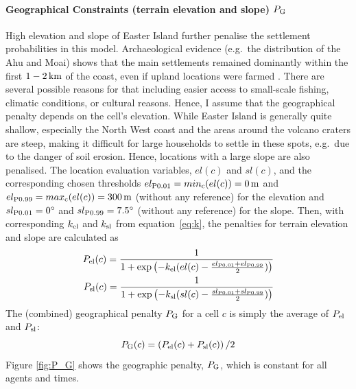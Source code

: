 \paragraph{Geographical Constraints (terrain elevation and slope) $P_{\rm G}$}
High elevation and slope of Easter Island further penalise the settlement probabilities in this model.
Archaeological evidence (e.g.\ the distribution of the Ahu and Moai) shows that the main settlements remained dominantly within the first $1-2\, \rm{km}$ of the coast, even if upland locations were farmed \citep{Bahn2017}.
There are several possible reasons for that including easier access to small-scale fishing, climatic conditions, or cultural reasons.
Hence, I assume that the geographical penalty depends on the cell's elevation.
While Easter Island is generally quite shallow, especially the North West coast and the areas around the volcano craters are steep, making it difficult for large households to settle in these spots, e.g.\ due to the danger of soil erosion. 
Hence, locations with a large slope are also penalised.
The location evaluation variables, $el(c)$ and $sl(c)$, and the corresponding chosen thresholds $el_{\rm P0.01}=min_{\rm c}(el(c))=0\, {\rm m}$ and $el_{\rm P0.99}=max_{\rm c}(el(c)) = 300\, {\rm m}$ (without any reference) for the elevation and $sl_{\rm P0.01}=0^\circ$ and $sl_{\rm P0.99}=7.5^\circ$ (without any reference) for the slope. 
Then, with corresponding $k_{\rm el}$ and $k_{\rm sl}$ from equation~\ref{eq:k}, the penalties for terrain elevation and slope are calculated as 
\begin{eqnarray}
	P_{\text{el}}(c) = \frac{1}{1+\exp\left( - k_{\rm el} (el(c)-\frac{el_{\rm P0.01}+el_{\rm P0.99}}{2}) \right)}\\
	P_{\text{sl}}(c) = \frac{1}{1+\exp\left( - k_{\rm sl} (sl(c)-\frac{sl_{\rm P0.01}+sl_{\rm P0.99}}{2}) \right)}
\end{eqnarray}
The (combined) geographical penalty $P_{\rm G}$ for a cell $c$ is simply the average of $P_{\rm el}$ and $P_{\rm sl}$:
\begin{equation}
P_{\rm G}(c) = \left(P_\text{el}(c)+P_\text{sl}(c) \right)/2
\end{equation}
Figure \ref{fig:P_G} shows the geographic penalty, $P_{\rm G}$, which is constant for all agents and times.
